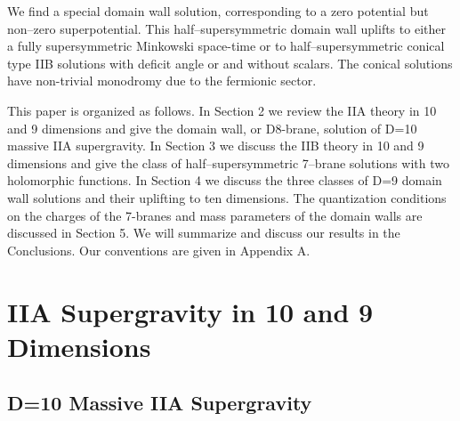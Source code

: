 \documentclass[12pt,a4paper]{article}
\begin{document}
We  find a special domain wall solution, corresponding to a zero
potential but non--zero superpotential. This half--supersymmetric domain
wall uplifts to either a fully supersymmetric Minkowski space-time or to 
half--supersymmetric conical type IIB solutions with deficit
angle \coordHE{} or \coordHE{} and without scalars. The conical
solutions have non-trivial monodromy due to the fermionic sector.


This paper is organized as follows. In Section 2 we review the IIA
theory in 10 and 9 dimensions and give the domain wall, or
D8-brane, solution of D=10 massive IIA supergravity. In Section 3
we discuss the IIB theory in 10 and 9 dimensions and give the
class of half--supersymmetric 7--brane solutions with two
holomorphic functions. In Section 4 we discuss the three classes
of D=9 domain wall solutions and their uplifting to ten
dimensions. The quantization conditions on the charges of the 7-branes
and mass parameters of the domain walls are discussed in Section 5. We
will summarize and discuss our results in the Conclusions. Our
conventions are given in Appendix A.



\section{IIA Supergravity in 10 and 9 Dimensions}

\subsection{D=10 Massive IIA Supergravity}
\end{document}

